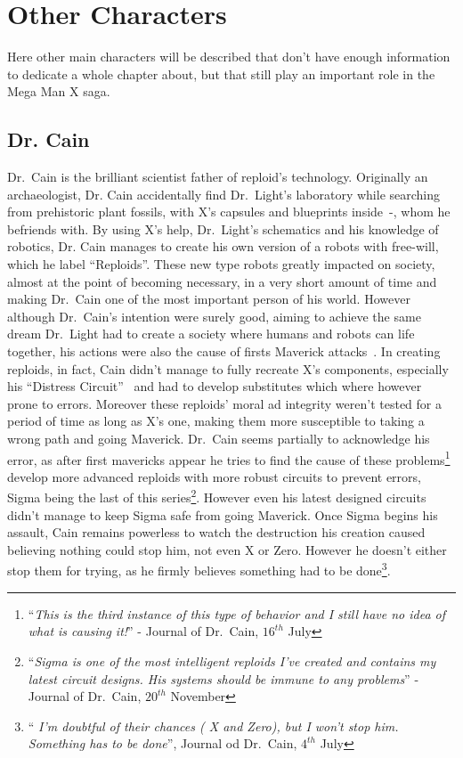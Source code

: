 \chapter{Other Characters}
Here other main characters will be described that don't have enough information to dedicate a whole chapter
about, but that still play an important role in the Mega Man X saga.

\section{Dr. Cain} \label{char:Cain}
Dr.~Cain is the brilliant scientist father of reploid's technology. Originally an archaeologist, Dr. Cain accidentally find Dr.~Light's laboratory while searching from prehistoric plant fossils, with X's capsules and blueprints inside~\cite{wiki:Cain_journal}-\cite{elysium_Cain_journal}, whom he befriends with. By using X's help, Dr.~Light's schematics and his knowledge of robotics, Dr. Cain manages to create his own version of a robots with free-will, which he label ``Reploids''. These new type robots greatly impacted on society, almost at the point of becoming necessary, in a very short amount of time and making Dr.~Cain one of the most important person of his world. However although Dr.~Cain's intention were surely good, aiming to achieve the same dream Dr.~Light had to create a society where humans and robots can life together, his actions were also the cause of firsts Maverick attacks~\cite{book:MH_field_guide}. In creating reploids, in fact, Cain didn't manage to fully recreate X's components, especially his ``Distress Circuit''~\cite{book:RMZ_Complete_works} and had to develop substitutes which where however prone to errors. Moreover these reploids' moral ad integrity weren't tested for a period of time as long as X's one, making them more susceptible to taking a wrong path and going Maverick. Dr.~Cain seems partially to acknowledge his error, as after first mavericks appear he tries to find the cause of these problems\footnote{``\textit{This is the third instance of this type of behavior and I still have no idea of what is causing it!}'' - Journal of Dr.~Cain, $16^{th}$ July} develop more advanced reploids with more robust circuits to prevent errors, Sigma being the last of this series\footnote{``\textit{Sigma is one of the most intelligent reploids I've created and contains my latest circuit designs. His systems should be immune to any problems}'' - Journal of Dr.~Cain, $20^{th}$ November}. However even his latest designed circuits didn't manage to keep Sigma safe from going Maverick. Once Sigma begins his assault, Cain remains powerless to watch the destruction his creation caused believing nothing could stop him, not even X or Zero. However he doesn't either stop them for trying, as  he firmly believes something had to be done\footnote{``\textit{ I'm doubtful of their chances ( X and Zero), but I won't stop him. Something has to be done}'', Journal od Dr.~Cain, $4^{th}$ July}.

